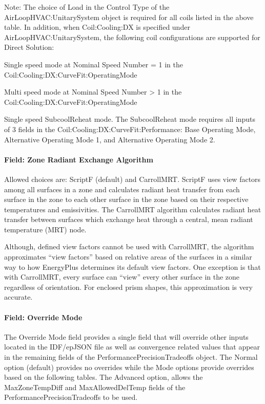 Note: The choice of Load in the Control Type of the AirLoopHVAC:UnitarySystem object is required for all coils listed in the above table.
In addition, when Coil:Cooling:DX is specified under AirLoopHVAC:UnitarySystem, the following coil configurations are supported for Direct Solution:

Single speed mode at Nominal Speed Number = 1 in the Coil:Cooling:DX:CurveFit:OperatingMode

Multi speed mode at Nominal Speed Number > 1 in the Coil:Cooling:DX:CurveFit:OperatingMode

Single speed SubcoolReheat mode. The SubcoolReheat mode requires all inputs of 3 fields in the Coil:Cooling:DX:CurveFit:Performance: Base Operating Mode, Alternative Operating Mode 1, and Alternative Operating Mode 2.

\paragraph{Field: Zone Radiant Exchange Algorithm}\label{zone-radiant-exchange-algorithm}

Allowed choices are: ScriptF (default) and CarrollMRT. ScriptF uses view factors among all surfaces in a zone and calculates radiant heat transfer from each surface in the zone to each other surface in the zone based on their respective temperatures and emissivities. The CarrollMRT algorithm calculates radiant heat transfer between surfaces which exchange heat through a central, mean radiant temperature (MRT) node.

Although, defined view factors cannot be used with CarrollMRT, the algorithm approximates ``view factors'' based on relative areas of the surfaces in a similar way to how EnergyPlus determines its default view factors. One exception is that with CarrollMRT, every surface can ``view'' every other surface in the zone regardless of orientation. For enclosed prism shapes, this approximation is very accurate.

\paragraph{Field: Override Mode}\label{override-mode}

The Override Mode field provides a single field that will override other inputs located in the IDF/epJSON file as well as convergence related values that appear in the remaining fields of the PerformancePrecisionTradeoffs object. The Normal option (default) provides no overrides while the Mode options provide overrides based on the following tables. The Advanced option, allows the MaxZoneTempDiff and MaxAllowedDelTemp fields of the PerformancePrecisionTradeoffs to be used.


